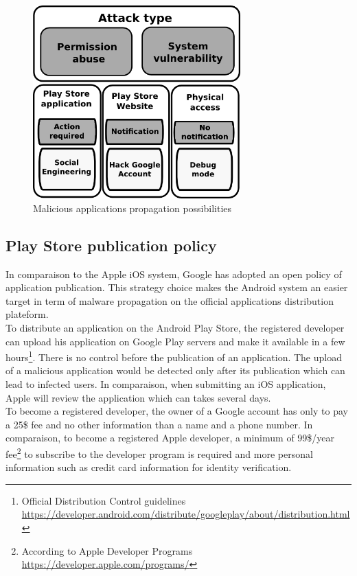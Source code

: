 \begin{figure}[h]
  \centering
  \includegraphics[width=8cm]{images/secu-graph.png}
  \caption{Malicious applications propagation possibilities}
  \label{fig:secu-graph}
\end{figure}

\subsection{Play Store publication policy}

In comparaison to the Apple iOS system, Google has adopted an open policy of application publication.
This strategy choice makes the Android system an easier target in term of malware propagation on the official applications distribution plateform.\\

To distribute an application on the Android Play Store, the registered developer can upload his application on Google Play servers and make it available in a few hours\footnote{Official Distribution Control guidelines \url{https://developer.android.com/distribute/googleplay/about/distribution.html}}.
There is no control before the publication of an application.
The upload of a malicious application would be detected only after its publication which can lead to infected users.
In comparaison, when submitting an iOS application, Apple will review the application which can takes several days.\\

To become a registered developer, the owner of a Google account has only to pay a 25\$ fee and no other information than a name and a phone number.
In comparaison, to become a registered Apple developer, a minimum of 99\$/year fee\footnote{According to Apple Developer Programs \url{https://developer.apple.com/programs/}} to subscribe to the developer program is required and more personal information such as credit card information for identity verification.\\


